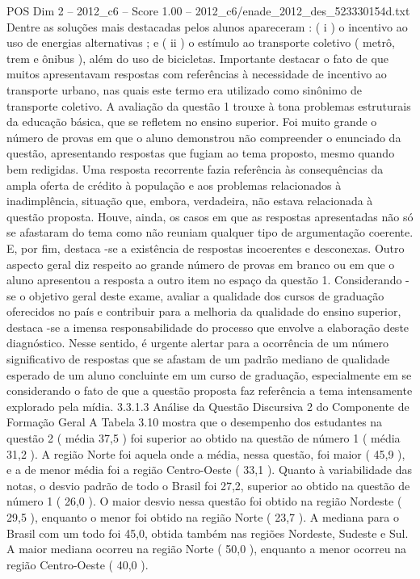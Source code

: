 \begin{textsample}{POS Dim 2 – 2012\_c6 – Score 1.00 – 2012\_c6/enade\_2012\_des\_523330154d.txt}
Dentre as soluções mais destacadas pelos alunos apareceram : ( i ) o incentivo ao uso de energias alternativas ; e ( ii ) o estímulo ao transporte coletivo ( metrô, trem e ônibus ), além do uso de bicicletas.
Importante destacar o fato de que muitos apresentavam respostas com referências à necessidade de incentivo ao transporte urbano, nas quais este termo era utilizado como sinônimo de transporte coletivo.
A avaliação da questão 1 trouxe à tona problemas estruturais da educação básica, que se refletem no ensino superior.
Foi muito grande o número de provas em que o aluno demonstrou não compreender o enunciado da questão, apresentando respostas que fugiam ao tema proposto, mesmo quando bem redigidas.
Uma resposta recorrente fazia referência às consequências da ampla oferta de crédito à população e aos problemas relacionados à inadimplência, situação que, embora, verdadeira, não estava relacionada à questão proposta.
Houve, ainda, os casos em que as respostas apresentadas não só se afastaram do tema como não reuniam qualquer tipo de argumentação coerente.
E, por fim, destaca -se a existência de respostas incoerentes e desconexas.
Outro aspecto geral diz respeito ao grande número de provas em branco ou em que o aluno apresentou a resposta a outro item no espaço da questão 1.
Considerando -se o objetivo geral deste exame, avaliar a qualidade dos cursos de graduação oferecidos no país e contribuir para a melhoria da qualidade do ensino superior, destaca -se a imensa responsabilidade do processo que envolve a elaboração deste diagnóstico.
Nesse sentido, é urgente alertar para a ocorrência de um número significativo de respostas que se afastam de um padrão mediano de qualidade esperado de um aluno concluinte em um curso de graduação, especialmente em se considerando o fato de que a questão proposta faz referência a tema intensamente explorado pela mídia. 3.3.1.3 Análise da Questão Discursiva 2 do Componente de Formação Geral A Tabela 3.10 mostra que o desempenho dos estudantes na questão 2 ( média 37,5 ) foi superior ao obtido na questão de número 1 ( média 31,2 ).
A região Norte foi aquela onde a média, nessa questão, foi maior ( 45,9 ), e a de menor média foi a região Centro-Oeste ( 33,1 ).
Quanto à variabilidade das notas, o desvio padrão de todo o Brasil foi 27,2, superior ao obtido na questão de número 1 ( 26,0 ).
O maior desvio nessa questão foi obtido na região Nordeste ( 29,5 ), enquanto o menor foi obtido na região Norte ( 23,7 ).
A mediana para o Brasil com um todo foi 45,0, obtida também nas regiões Nordeste, Sudeste e Sul.
A maior mediana ocorreu na região Norte ( 50,0 ), enquanto a menor ocorreu na região Centro-Oeste ( 40,0 ).

\end{textsample}
